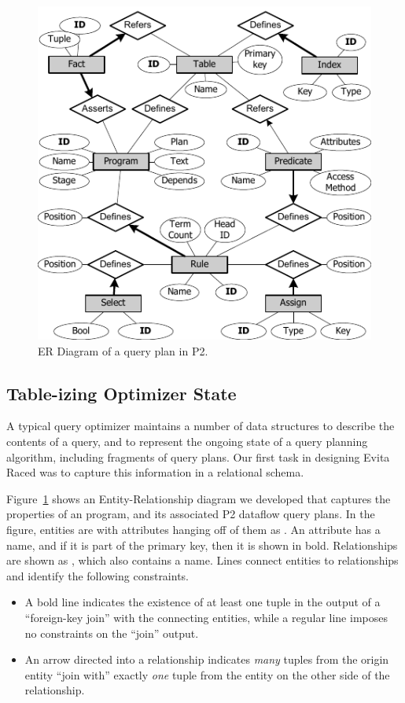 \begin{figure}
\ssp
\begin{center}
\includegraphics[scale=1.2]{figures/ERDiagram}
\caption{ER Diagram of a query plan in P2.}
\label{ch:evita:fig:p2er}
\end{center}
\end{figure}

\subsection{Table-izing Optimizer State} 
\label{ch:evita:sec:catalog}

A typical query optimizer maintains a number of data structures to describe the
contents of a query, and to represent the ongoing state of a query planning
algorithm, including fragments of query plans.  Our first task in designing
Evita Raced was to capture this information in a relational schema.

Figure~\ref{ch:evita:fig:p2er} shows an Entity-Relationship diagram we
developed that captures the properties of an \OVERLOG program, and its
associated P2 dataflow query plans.  In the figure, entities are  with
attributes hanging off of them as .  An attribute has a name, and if it is
part of the primary key, then it is shown in bold.  Relationships are shown as
, which also contains a name.  Lines connect entities to relationships 
and identify the following constraints.
\begin{itemize}
  \item A bold line indicates the existence of at least one tuple in the output
    of a ``foreign-key join'' with the connecting entities, while a regular line
    imposes no constraints on the ``join'' output.
  \item An arrow directed into a relationship indicates {\em many} tuples from
    the origin entity ``join with'' exactly {\em one} tuple from the entity on
    the other side of the relationship.
\end{itemize}

